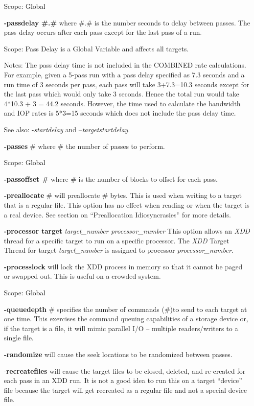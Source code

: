 Scope: Global

\textbf{-passdelay \#.\#} where \#.\# is the number seconds to delay between passes. The pass delay occurs after each pass except for the last pass of a run.

Scope: Pass Delay is a Global Variable and affects all targets.

Notes: The pass delay time is not included in the COMBINED rate calculations. For example, given a 5-pass run with a pass delay specified as 7.3 seconds and a run time of 3 seconds per pass, each pass will take 3+7.3=10.3 seconds except for the last pass which would only take 3 seconds. Hence the total run would take 4*10.3 + 3 = 44.2 seconds. However, the time used to calculate the bandwidth and IOP rates is 5*3=15 seconds which does not include the pass delay time.

See also: -\emph{startdelay} and --\emph{targetstartdelay}.

\textbf{-passes} \# where \# the number of passes to perform.

Scope: Global

\textbf{-passoffset \#} where \# is the number of blocks to offset for each pass.

\textbf{-preallocate} \# will preallocate \# bytes. This is used when writing to a target that is a regular file. This option has no effect when reading or when the target is a real device. See section on ``Preallocation Idiosyncrasies'' for more details.

\textbf{-processor target} \emph{target\_number processor\_number} This option allows an \emph{XDD} thread for a specific target to run on a specific processor. The \emph{XDD} Target Thread for target \emph{target\_number} is assigned to processor \emph{processor\_number.}

\textbf{-processlock} will lock the XDD process in memory so that it cannot be paged or swapped out. This is useful on a crowded system.

Scope: Global

\textbf{-queuedepth} \# specifies the number of commands (\#)to send to each target at one time. This exercises the command queuing capabilities of a storage device or, if the target is a file, it will mimic parallel I/O -- multiple readers/writers to a single file.

\textbf{-randomize} will cause the seek locations to be randomized between passes.

-\textbf{recreatefiles} will cause the target files to be closed, deleted, and re-created for each pass in an XDD run. It is not a good idea to run this on a target ``device'' file because the target will get recreated as a regular file and not a special device file.

